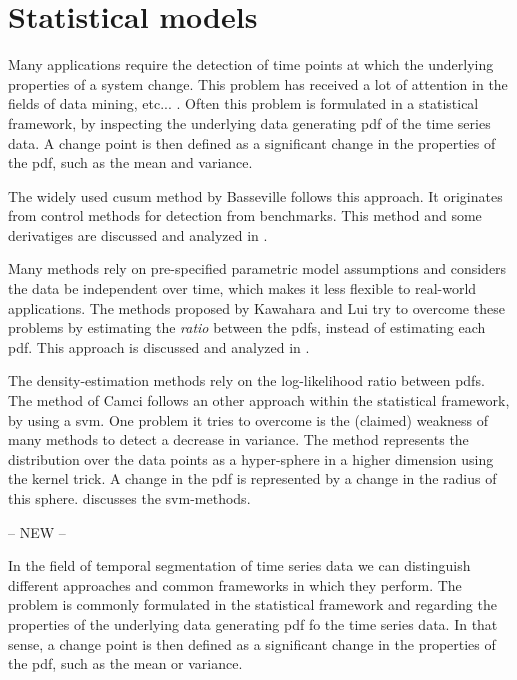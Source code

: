 \section{Statistical models}\label{sec:literature_review_statistical_models}


Many applications require the detection of time points at which the underlying properties of a system change.
This problem has received a lot of attention in the fields of data mining, etc... .
Often this problem is formulated in a statistical framework, by inspecting the underlying data generating \gls{pdf} of the time series data.
A change point is then defined as a significant change in the properties of the \gls{pdf}, such as the mean and variance.

The widely used \gls{cusum} method by Basseville \etal \cite{basseville1993detection} follows this approach.
It originates from control methods for detection from benchmarks.
This method and some derivatiges are discussed and analyzed in .

Many methods rely on pre-specified parametric model assumptions and considers the data be independent over time, which makes it less flexible to real-world applications.
The methods proposed by Kawahara \etal \cite{kawahara2009change} and Lui \etal \cite{liu2013change} try to overcome these problems by estimating the \emph{ratio} between the \glspl{pdf}, instead of estimating each \gls{pdf}.
This approach is discussed and analyzed in .

The density-estimation methods rely on the log-likelihood ratio between \glspl{pdf}.
The method of Camci \cite{camci2010change} follows an other approach within the statistical framework, by using a \gls{svm}.
One problem it tries to overcome is the (claimed) weakness of many methods to detect a decrease in variance.
The method represents the distribution over the data points as a hyper-sphere in a higher dimension using the kernel trick.
A change in the \gls{pdf} is represented by a change in the radius of this sphere.
 discusses the \gls{svm}-methods.


-- NEW --

In the field of temporal segmentation of time series data we can distinguish different approaches and common frameworks in which they perform.
The problem is commonly formulated in the statistical framework and regarding the properties of the underlying data generating \gls{pdf} fo the time series data.
In that sense, a change point is then defined as a significant change in the properties of the \gls{pdf}, such as the mean or variance.

